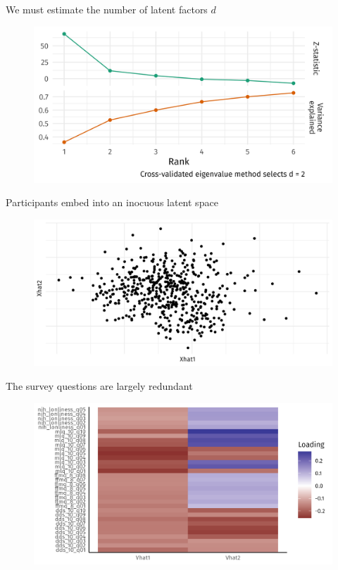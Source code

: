 \documentclass[aspectratio=169]{beamer}
\theoremstyle{remark}
\begin{document}
\begin{frame}{We must estimate the number of latent factors $d$}
    \centering
    \begin{figure}
        \includegraphics{figures/rank-determination.png}
    \end{figure}
\end{frame}

\begin{frame}{Participants embed into an inocuous latent space}
    \centering
    \begin{figure}
        \includegraphics[width=\textwidth]{figures/xhat.png}
    \end{figure}
\end{frame}

\begin{frame}{The survey questions are largely redundant}
    \begin{figure}
        \includegraphics{figures/vhat.png}
    \end{figure}
\end{frame}
\end{document}
